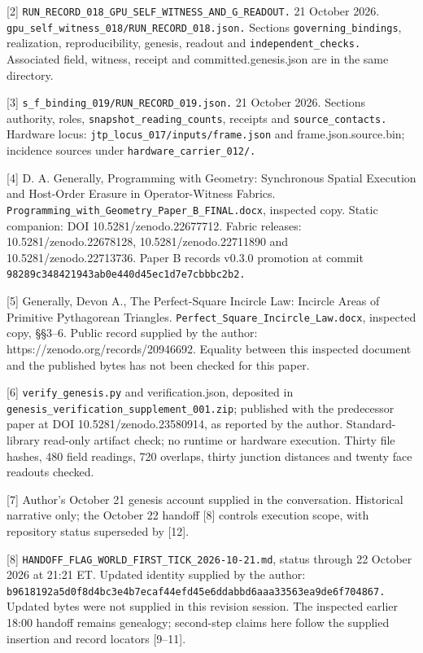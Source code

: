 \documentclass[
]{article}
\begin{document}
{[}2{]} \nolinkurl{RUN_RECORD_018_GPU_SELF_WITNESS_AND_G_READOUT.} 21
October 2026. \nolinkurl{gpu_self_witness_018/RUN_RECORD_018.json.}
Sections \nolinkurl{governing_bindings}, realization, reproducibility,
genesis, readout and \nolinkurl{independent_checks.} Associated field,
witness, receipt and committed.genesis.json are in the same directory.

{[}3{]} \nolinkurl{s_f_binding_019/RUN_RECORD_019.json.} 21 October
2026. Sections authority, roles, \nolinkurl{snapshot_reading_counts},
receipts and \nolinkurl{source_contacts.} Hardware locus:
\nolinkurl{jtp_locus_017/inputs/frame.json} and frame.json.source.bin;
incidence sources under \nolinkurl{hardware_carrier_012/.}

{[}4{]} D. A. Generally, Programming with Geometry: Synchronous Spatial
Execution and Host-Order Erasure in Operator-Witness Fabrics.
\nolinkurl{Programming_with_Geometry_Paper_B_FINAL.docx}, inspected
copy. Static companion: DOI 10.5281/zenodo.22677712. Fabric releases:
10.5281/zenodo.22678128, 10.5281/zenodo.22711890 and
10.5281/zenodo.22713736. Paper B records v0.3.0 promotion at commit
\nolinkurl{98289c348421943ab0e440d45ec1d7e7cbbbc2b2.}

{[}5{]} Generally, Devon A., The Perfect-Square Incircle Law: Incircle
Areas of Primitive Pythagorean Triangles.
\nolinkurl{Perfect_Square_Incircle_Law.docx}, inspected copy, §§3--6.
Public record supplied by the author:
https://zenodo.org/records/20946692. Equality between this inspected
document and the published bytes has not been checked for this paper.

{[}6{]} \nolinkurl{verify_genesis.py} and verification.json, deposited
in \nolinkurl{genesis_verification_supplement_001.zip}; published with
the predecessor paper at DOI 10.5281/zenodo.23580914, as reported by the
author. Standard-library read-only artifact check; no runtime or
hardware execution. Thirty file hashes, 480 field readings, 720
overlaps, thirty junction distances and twenty face readouts checked.

{[}7{]} Author's October 21 genesis account supplied in the
conversation. Historical narrative only; the October 22 handoff {[}8{]}
controls execution scope, with repository status superseded by {[}12{]}.

{[}8{]} \nolinkurl{HANDOFF_FLAG_WORLD_FIRST_TICK_2026-10-21.md}, status
through 22 October 2026 at 21:21 ET. Updated identity supplied by the
author:
\nolinkurl{b9618192a5d0f8d4bc3e4b7ecaf44efd45e6ddabbd6aaa33563ea9de6f704867.}
Updated bytes were not supplied in this revision session. The inspected
earlier 18:00 handoff remains genealogy; second-step claims here follow
the supplied insertion and record locators {[}9--11{]}.
\end{document}
